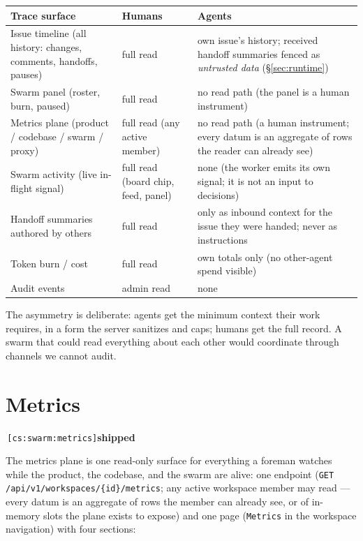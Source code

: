 \documentclass[11pt,a4paper]{report}
\newcommand{\cs}[1]{\,\texttt{\scriptsize[cs:#1]}\label{cs:#1}}
\newcommand{\shipped}{\textbf{\textcolor{green!45!black}{shipped}}}
\begin{document}
\begin{center}
\begin{tabular}{@{}p{}p{}p{}@{}}
\toprule
\textbf{Trace surface} & \textbf{Humans} & \textbf{Agents}\\
\midrule
Issue timeline (all history: changes,
  comments, handoffs, pauses) & full read & own issue's history; received
  handoff summaries fenced as \emph{untrusted data} (\S\ref{sec:runtime})\\
Swarm panel (roster, burn, paused) & full read & no read path (the panel
  is a human instrument)\\
Metrics plane (product / codebase / swarm / proxy) & full read (any active
  member) & no read path (a human instrument; every datum is an aggregate
  of rows the reader can already see)\\
Swarm activity (live in-flight signal) & full read (board chip, feed,
  panel) & none (the worker emits its own signal; it is not an input to
  decisions)\\
Handoff summaries authored by others & full read & only as inbound
  context for the issue they were handed; never as instructions\\
Token burn / cost & full read & own totals only (no other-agent spend
  visible)\\
Audit events & admin read & none\\
\bottomrule
\end{tabular}
\end{center}

The asymmetry is deliberate: agents get the minimum context their work
requires, in a form the server sanitizes and caps; humans get the full
record. A swarm that could read everything about each other would
coordinate through channels we cannot audit.

\section{Metrics}
\label{sec:metrics}
\cs{swarm:metrics}\shipped\

The metrics plane is one read-only surface for everything a foreman
watches while the product, the codebase, and the swarm are alive: one
endpoint (\texttt{GET /api/v1/workspaces/\{id\}/metrics}; any active
workspace member may read --- every datum is an aggregate of rows the
member can already see, or of in-memory slots the plane exists to
expose) and one page (\texttt{Metrics} in the workspace navigation)
with four sections:
\end{document}
